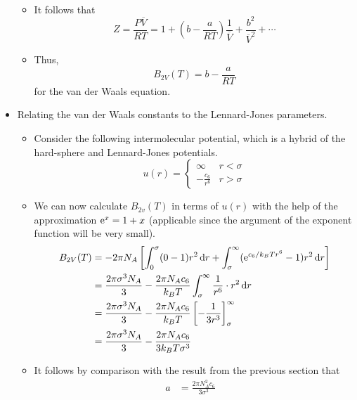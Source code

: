 \documentclass[../notes.tex]{subfiles}
\begin{document}
\begin{itemize}
\begin{itemize}
\begin{align*}
        \end{align*}
        \item It follows that
        \begin{equation*}
            Z = \frac{P\overline{V}}{RT} = 1+\left( b-\frac{a}{RT} \right)\frac{1}{\overline{V}}+\frac{b^2}{\overline{V}^2}+\cdots
        \end{equation*}
        \item Thus,
        \begin{equation*}
            B_{2V}(T) = b-\frac{a}{RT}
        \end{equation*}
        for the van der Waals equation.
    \end{itemize}
    \item Relating the van der Waals constants to the Lennard-Jones parameters.
    \begin{itemize}
        \item Consider the following intermolecular potential, which is a hybrid of the hard-sphere and Lennard-Jones potentials.
        \begin{equation*}
            u(r) =
            \begin{cases}
                \infty & r<\sigma\\
                -\frac{c_6}{r^6} & r>\sigma
            \end{cases}
        \end{equation*}
        \item We can now calculate $B_{2v}(T)$ in terms of $u(r)$ with the help of the approximation $\e[x]=1+x$ (applicable since the argument of the exponent function will be very small).
        \begin{align*}
            B_{2V}(T) &= -2\pi N_A\left[ \int_0^\sigma(0-1)r^2\dd{r}+\int_\sigma^\infty(\e[c_6/k_BTr^6]-1)r^2\dd{r} \right]\\
            &= \frac{2\pi\sigma^3N_A}{3}-\frac{2\pi N_Ac_6}{k_BT}\int_\sigma^\infty\frac{1}{r^6}\cdot r^2\dd{r}\\
            &= \frac{2\pi\sigma^3N_A}{3}-\frac{2\pi N_Ac_6}{k_BT}\left[ -\frac{1}{3r^3} \right]_\sigma^\infty\\
            &= \frac{2\pi\sigma^3N_A}{3}-\frac{2\pi N_Ac_6}{3k_BT\sigma^3}
        \end{align*}
        \item It follows by comparison with the result from the previous section that
        \begin{align*}
            a &= \frac{2\pi N_A^2c_6}{3\sigma^3}&

\end{align*}
\end{itemize}
\end{itemize}
\end{document}

